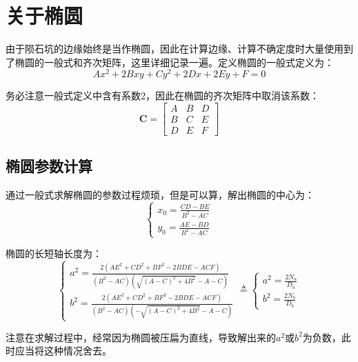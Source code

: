 \documentclass{article}
\begin{document}
\section{关于椭圆}
由于陨石坑的边缘始终是当作椭圆，因此在计算边缘、计算不确定度时大量使用到了椭圆的一般式和齐次矩阵，这里详细记录一遍。定义椭圆的一般式定义为：
\begin{equation}
  Ax^2+2Bxy+Cy^2+2Dx+2Ey+F=0\label{eq:ellipse}
\end{equation}\par
务必注意一般式定义中含有系数2，因此在椭圆的齐次矩阵中取消该系数：
\begin{equation}
  \mathbf{C}=\begin{bmatrix}
    A&B&D\\
    B&C&E\\
    D&E&F
  \end{bmatrix}
\end{equation}\par
\subsection{椭圆参数计算}
通过一般式求解椭圆的参数过程烦琐，但是可以算，解出椭圆的中心为：
\begin{equation*}
  \begin{cases}
    x_0=\frac{CD-BE}{B^2-AC}\\
    y_0=\frac{AE-BD}{B^2-AC}
  \end{cases}
\end{equation*}\par
椭圆的长短轴长度为：
\begin{equation*}
  \begin{cases}
    a^2=\frac{2(AE^2+CD^2+BF^2-2BDE-ACF)}{(B^2-AC)(\sqrt{(A-C)^2+4B^2}-A-C)}\\
    b^2=\frac{2(AE^2+CD^2+BF^2-2BDE-ACF)}{(B^2-AC)(-\sqrt{(A-C)^2+4B^2}-A-C)}
  \end{cases}\triangleq\begin{cases}
    a^2=\frac{2N_a}{D_a}\\
    b^2=\frac{2N_b}{D_b}
  \end{cases}
\end{equation*}\par
注意在求解过程中，经常因为椭圆被压扁为直线，导致解出来的$a^2$或$b^2$为负数，此时应当将这种情况舍去。
\end{document}
